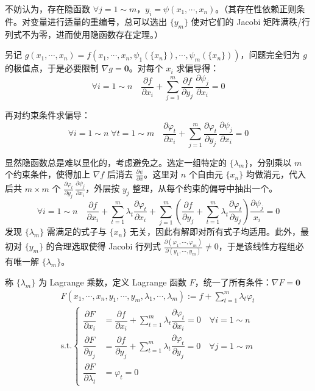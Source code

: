 \documentclass[12pt, a4paper, UTF8, openany]{ctexbook}
\newcommand{\mat}[1]{\mathbf{#1}}
\begin{document}
        不妨认为，存在隐函数 $\forall j = 1 \sim m$，$y_i = \psi(x_1, \cdots, x_n)$。（其存在性依赖正则条件。对变量进行适量的重编号，总可以选出 $\{y_m\}$ 使对它们的 Jacobi 矩阵满秩/行列式不为零，进而使用隐函数存在定理。）

        另记 $g(x_1, \cdots, x_n) = f(x_1, \cdots, x_n, \psi_1(\{x_n\}), \cdots, \psi_m(\{x_n\}))$，问题完全归为 $g$ 的极值点，于是必要限制 $\nabla g = \mat{0}$。对每个 $x_i$ 求偏导得：
        $$\forall i = 1 \sim n \quad \frac{\partial f}{\partial x_i} + \sum_{j = 1}^{m} \frac{\partial f}{\partial y_j} \, \frac{\partial \psi_j}{\partial x_i} = 0$$

        再对约束条件求偏导：
        $$\forall i = 1 \sim n \; \forall t = 1 \sim m \quad \frac{\partial \varphi_t}{\partial x_i} + \sum_{j = 1}^{m} \frac{\partial \varphi_t}{\partial y_j} \, \frac{\partial \psi_j}{\partial x_i} = 0$$

        显然隐函数总是难以显化的，考虑避免之。选定一组特定的 $\{\lambda_m\}$，分别乘以 $m$ 个约束条件，使得加上 $\nabla f$ 后消去 $\frac{\partial \psi}{\partial x}$。这里对 $n$ 个自由元 $\{x_n\}$ 均做消元，代入后共 $m \times m$ 个 $\frac{\partial \varphi_t}{\partial y_j} \, \frac{\partial \psi_j}{\partial x_i}$，外层按 $y_j$ 整理，从每个约束的偏导中抽出一个。
        $$\forall i = 1 \sim n \quad \boxed{\frac{\partial f}{\partial x_i} + \sum_{t = 1}^{m} \lambda_t \frac{\partial \varphi_t}{\partial x_i}}  + \sum_{j = 1}^{m} (\boxed{\frac{\partial f}{\partial y_j} + \sum_{t = 1}^{m} \lambda_t\frac{\partial \varphi_t}{\partial y_j}}  )\frac{\partial \psi_j}{x_i} = 0$$
        发现 $\{\lambda_m\}$ 需满足的式子与 $\{x_n\}$ 无关，因此有解即对所有式子均适用。此外，最初对 $\{y_m\}$ 的合理选取使得 Jacobi 行列式 $\frac{\partial(\varphi_1, \cdots, \varphi_m)}{\partial (y_1, \cdots, y_m)} \neq 0$，于是该线性方程组必有唯一解 $\{\lambda_m\}$。

        称 $\{\lambda_m\}$ 为 Lagrange 乘数，定义 Lagrange 函数 $F$，统一了所有条件：$\nabla F = \mat{0}$
        $$\begin{matrix}
            F(x_1, \cdots, x_n, y_1, \cdots, y_m, \lambda_1, \cdots, \lambda_m) := f + \sum\limits_{t = 1}^{m} \lambda_t \varphi_t \\
            \text{s.t.} \begin{cases}
                \dfrac{\partial F}{\partial x_i} &= \dfrac{\partial f}{\partial x_i} + \sum\limits_{t = 1}^{m} \lambda_t \dfrac{\partial \varphi_t}{\partial x_i} = 0 \quad \forall i = 1 \sim n \\
                \dfrac{\partial F}{\partial y_j} &= \dfrac{\partial f}{\partial y_j} + \sum\limits_{t = 1}^{m} \lambda_t \dfrac{\partial \varphi_t}{\partial y_j} = 0 \quad \forall j = 1 \sim m\\
                \dfrac{\partial F}{\partial \lambda_t} &= \varphi_t = 0
            \end{cases}
        \end{matrix}$$
\end{document}
